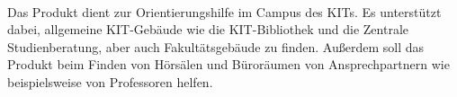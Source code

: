 \paragraph*{}
Das Produkt dient zur Orientierungshilfe im Campus des \Gls{KIT}s.
Es unterstützt dabei, allgemeine \Gls{KIT}-Gebäude wie die \Gls{KIT}-Bibliothek und die Zentrale Studienberatung, aber auch Fakultätsgebäude zu finden. 
Außerdem soll das Produkt beim Finden von Hörsälen und Büroräumen von Ansprechpartnern wie beispielsweise von Professoren helfen.
